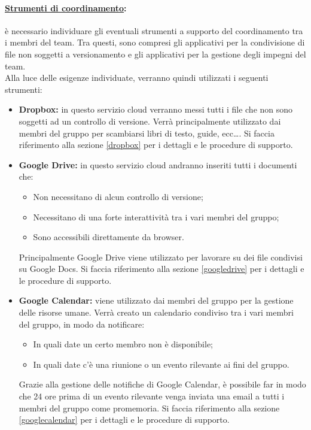 \paragraph{\underline{Strumenti di coordinamento}:} è necessario individuare gli eventuali strumenti a supporto del coordinamento tra i membri del team. Tra questi, sono compresi gli applicativi per la condivisione di file non soggetti a versionamento e gli applicativi per la gestione degli impegni del team.\\
Alla luce delle esigenze individuate, verranno quindi utilizzati i seguenti strumenti:
\begin{itemize}
\item \textbf{Dropbox:} in questo servizio cloud verranno messi tutti i file che non sono soggetti ad un controllo di versione. Verrà principalmente utilizzato dai membri del gruppo per scambiarsi libri di testo, guide, ecc\dots . Si faccia riferimento alla sezione \ref{dropbox} per i dettagli e le procedure di supporto.
\item \textbf{Google Drive:} in questo servizio cloud andranno inseriti tutti i documenti che:
\begin{itemize}
	\item Non necessitano di alcun controllo di versione;
	\item Necessitano di una forte interattività tra i vari membri del gruppo;
	\item Sono accessibili direttamente da browser.
\end{itemize}
Principalmente Google Drive\g{} viene utilizzato per lavorare su dei file condivisi su Google Docs\g{}. Si faccia riferimento alla sezione \ref{googledrive} per i dettagli e le procedure di supporto.
\item \textbf{Google Calendar:} viene utilizzato dai membri del gruppo per la gestione delle risorse umane. Verrà creato un calendario condiviso tra i vari membri del gruppo, in modo da notificare:
\begin{itemize}
	\item In quali date un certo membro non è disponibile;
	\item In quali date c'è una riunione o un evento rilevante ai fini del gruppo.
\end{itemize}
Grazie alla gestione delle notifiche di Google Calendar\glossario{}, è possibile far in modo che 24 ore prima di un evento rilevante venga inviata una email a tutti i membri del gruppo come promemoria. Si faccia riferimento alla sezione \ref{googlecalendar} per i dettagli e le procedure di supporto.
\end{itemize}


